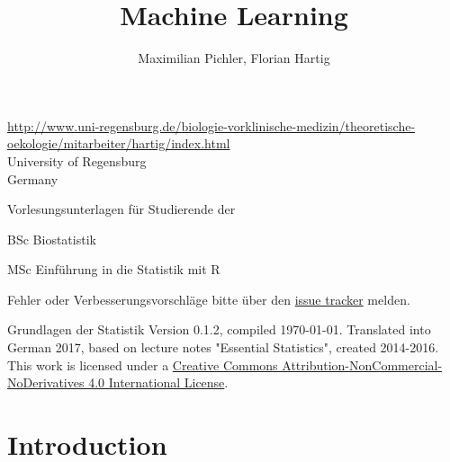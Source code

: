 \documentclass[a4paper,twoside]{tufte-book}\usepackage[]{graphicx}\usepackage[]{color}
\title{Machine Learning}
\author{Maximilian Pichler, Florian Hartig}
\begin{document}

\let\cleardoublepage\clearpage %
\maketitle


\thispagestyle{empty}
\null


\href{Prof. Dr. Florian Hartig}{http://www.uni-regensburg.de/biologie-vorklinische-medizin/theoretische-oekologie/mitarbeiter/hartig/index.html}\\
University of Regensburg\\
Germany\\[0.5cm]

\begin{fullwidth}
Vorlesungsunterlagen für Studierende der

\begin{itemize*}
  \item BSc Biostatistik
  \item MSc Einführung in die Statistik mit R
\end{itemize*}

\vspace{0.5cm}

Fehler oder Verbesserungsvorschläge bitte über den \href{https://github.com/TheoreticalEcology/machinelearning/issues}{issue tracker} melden. 

\end{fullwidth}


\vfill
\begin{fullwidth}
Grundlagen der Statistik Version 0.1.2, compiled \today. Translated into German 2017, based on lecture notes "Essential Statistics", created 2014-2016. This work is licensed under a \href{https://creativecommons.org/licenses/by-nc-nd/4.0/}{Creative Commons Attribution-NonCommercial-NoDerivatives 4.0 International License}. 
\end{fullwidth}


\newpage
\tableofcontents

\chapter{Introduction} %

\end{document}
